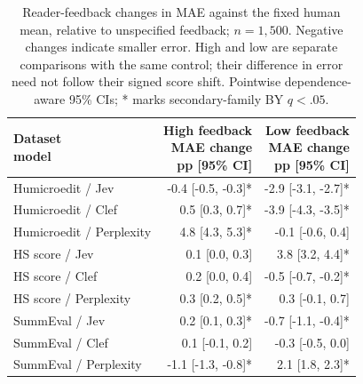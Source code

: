 \begin{table}[t]
\centering\footnotesize
\setlength{\tabcolsep}{3.5pt}
\begin{tabular}{@{}lrr@{}}
\toprule
\shortstack[l]{Dataset\\{}model} & \shortstack[l]{High feedback\\{}MAE change\\{}pp [95\% CI]} & \shortstack[l]{Low feedback\\{}MAE change\\{}pp [95\% CI]} \\
\midrule
Humicroedit / Jev & -0.4 [-0.5, -0.3]* & -2.9 [-3.1, -2.7]* \\
Humicroedit / Clef & 0.5 [0.3, 0.7]* & -3.9 [-4.3, -3.5]* \\
Humicroedit / Perplexity & 4.8 [4.3, 5.3]* & -0.1 [-0.6, 0.4] \\
HS score / Jev & 0.1 [0.0, 0.3] & 3.8 [3.2, 4.4]* \\
HS score / Clef & 0.2 [0.0, 0.4] & -0.5 [-0.7, -0.2]* \\
HS score / Perplexity & 0.3 [0.2, 0.5]* & 0.3 [-0.1, 0.7] \\
SummEval / Jev & 0.2 [0.1, 0.3]* & -0.7 [-1.1, -0.4]* \\
SummEval / Clef & 0.1 [-0.1, 0.2] & -0.3 [-0.5, 0.0] \\
SummEval / Perplexity & -1.1 [-1.3, -0.8]* & 2.1 [1.8, 2.3]* \\
\bottomrule
\end{tabular}
\caption{Reader-feedback changes in MAE against the fixed human mean, relative to unspecified feedback; $n=1{,}500$. Negative changes indicate smaller error. High and low are separate comparisons with the same control; their difference in error need not follow their signed score shift. Pointwise dependence-aware 95\% CIs; * marks secondary-family BY $q<.05$.}
\label{tab:appendix_reader_error}
\end{table}
